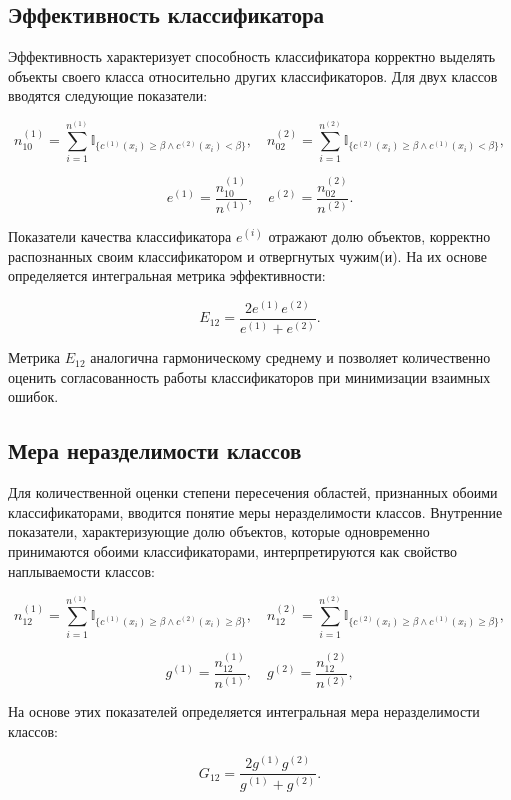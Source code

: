\subsection{Эффективность классификатора}

Эффективность характеризует способность классификатора корректно выделять объекты своего класса относительно других классификаторов. Для двух классов вводятся следующие показатели:

\[
n^{(1)}_{10} = \sum_{i=1}^{n^{(1)}} \mathbb{I}_{\{c^{(1)}(x_i) \geq \beta \wedge c^{(2)}(x_i) < \beta\}}, \quad
n^{(2)}_{02} = \sum_{i=1}^{n^{(2)}} \mathbb{I}_{\{c^{(2)}(x_i) \geq \beta \wedge c^{(1)}(x_i) < \beta\}},
\]

\[
e^{(1)} = \frac{n^{(1)}_{10}}{n^{(1)}}, \quad e^{(2)} = \frac{n^{(2)}_{02}}{n^{(2)}}.
\]

Показатели качества классификатора \(e^{(i)}\) отражают долю объектов, корректно распознанных своим классификатором и отвергнутых чужим(и). На их основе определяется интегральная метрика эффективности:

\[
E_{12} = \frac{2 e^{(1)} e^{(2)}}{e^{(1)} + e^{(2)}}.
\]

Метрика \(E_{12}\) аналогична гармоническому среднему и позволяет количественно оценить согласованность работы классификаторов при минимизации взаимных ошибок.


\subsection{Мера неразделимости классов}

Для количественной оценки степени пересечения областей, признанных обоими классификаторами, вводится понятие меры неразделимости классов. Внутренние показатели, характеризующие долю объектов, которые одновременно принимаются обоими классификаторами, интерпретируются как свойство наплываемости классов:

\[
n^{(1)}_{12} = \sum_{i=1}^{n^{(1)}} \mathbb{I}_{\{c^{(1)}(x_i) \geq \beta \wedge c^{(2)}(x_i) \geq \beta\}}, \quad
n^{(2)}_{12} = \sum_{i=1}^{n^{(2)}} \mathbb{I}_{\{c^{(2)}(x_i) \geq \beta \wedge c^{(1)}(x_i) \geq \beta\}},
\]

\[
g^{(1)} = \frac{n^{(1)}_{12}}{n^{(1)}}, \quad g^{(2)} = \frac{n^{(2)}_{12}}{n^{(2)}},
\]

На основе этих показателей определяется интегральная мера неразделимости классов:

\[
G_{12} = \frac{2 g^{(1)} g^{(2)}}{g^{(1)} + g^{(2)}}.
\]

